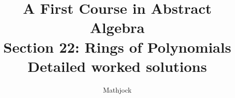 
\title{\textbf{A First Course in Abstract Algebra}\\[0.3em]Section 22: Rings of Polynomials\\[0.3em]\large Detailed worked solutions}
\author{Mathjock}
\date{}

\maketitle
\bookinfo
\tableofcontents
\clearpage
\renewcommand{\thesection}{22}
\renewcommand{\theHsection}{fraleigh.22}


